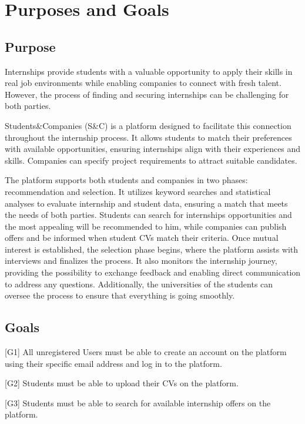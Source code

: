 \renewcommand{\thesection}{\Alph{section}}
\section{Purposes and Goals}\label{sec:purposeandgoals}
\subsection{Purpose}\label{subsec:purpose}
Internships provide students with a valuable opportunity to apply their skills in real job environments while enabling companies to connect with 
fresh talent. However, the process of finding and securing internships can be challenging for both parties.

Students\&Companies (S\&C) is a platform designed to facilitate this connection throughout the internship process. It allows 
students to match their preferences with available opportunities, ensuring internships align with their experiences and skills. 
Companies can specify project requirements to attract suitable candidates.

The platform supports both students and companies in two phases: recommendation and selection. It utilizes keyword searches 
and statistical analyses to evaluate internship and student data, ensuring a match that meets the needs of both parties. 
Students can search for internships opportunities and the most appealing will be recommended to him, while companies can publish offers and be 
informed when student CVs match their criteria. Once mutual interest is established, the selection phase begins, where the platform assists 
with interviews and finalizes the process. It also monitors the internship journey, providing the possibility to exchange feedback and 
enabling direct communication to address any questions. Additionally, the universities of the students can oversee the process to ensure 
that everything is going smoothly.

\subsection{Goals}\label{subsec:goals}
[G1] All unregistered Users must be able to create an account on the platform using their specific email address and log in to the platform.

[G2] Students must be able to upload their CVs on the platform.

[G3] Students must be able to search for available internship offers on the platform.

